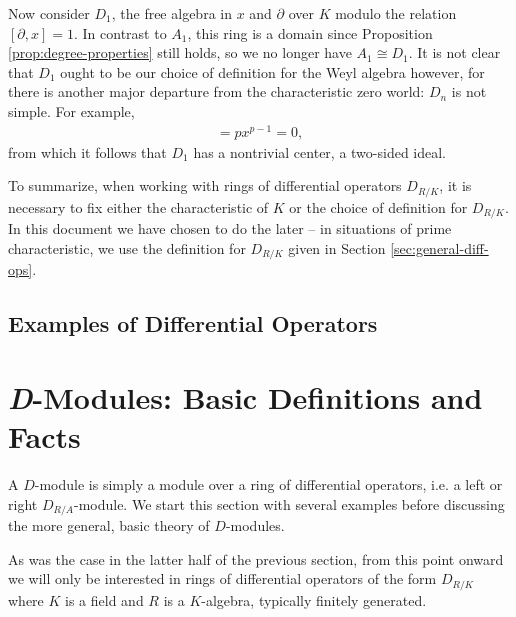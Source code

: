 Now consider $D_1$, the free algebra in $x$ and $\partial$ over $K$ modulo the relation $[\partial, x] = 1$. In contrast to $A_1$, this ring is a domain since Proposition \ref{prop:degree-properties} still holds, so we no longer have $A_1 \cong D_1$. It is not clear that $D_1$ ought to be our choice of definition for the Weyl algebra however, for there is another major departure from the characteristic zero world: $D_n$ is not simple. For example,
\begin{align*}
	[\partial, x^p] = px^{p- 1} = 0,
\end{align*}
from which it follows that $D_1$ has a nontrivial center, a two-sided ideal.

To summarize, when working with rings of differential operators $D_{R/K}$, it is necessary to fix either the characteristic of $K$ or the choice of definition for $D_{R/K}$. In this document we have chosen to do the later -- in situations of prime characteristic, we use the definition for $D_{R/K}$ given in Section \ref{sec:general-diff-ops}.

\subsection{Examples of Differential Operators}\label{sec:diff-op-examples}
\section{\textit{D}-Modules: Basic Definitions and Facts}
A $D$-module is simply a module over a ring of differential operators, i.e. a left or right $D_{R/A}$-module. We start this section with several examples before discussing the more general, basic theory of $D$-modules.

As was the case in the latter half of the previous section, from this point onward we will only be interested in rings of differential operators of the form $D_{R/K}$ where $K$ is a field and $R$ is a $K$-algebra, typically finitely generated. 
